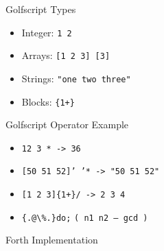 \documentclass{beamer}
\newcommand{\zwischenueberschrift}[1] { 
    \Huge{#1}
}
\begin{document}
\begin{frame}
    
    \vspace{0.5cm}

    Golfscript Types
    \begin{itemize}
        \item Integer: \texttt{1 2}
        \item Arrays:  \texttt{[1 2 3] [3]}
        \item Strings: \texttt{"one two three"}
        \item Blocks:  \texttt{\{1+\}}
    \end{itemize}

    \vspace{0.5cm}
    \pause 

    Golfscript Operator Example
    \begin{itemize}
        \item \texttt{12 3 * -> 36}
        \item \texttt{[50 51 52]' '* -> "50 51 52"}
        \item \texttt{[1 2 3]\{1+\}/ -> 2 3 4 }
        \item \texttt{\{.@\textbackslash\%.\}do;}  \texttt{( n1 n2 -- gcd )}
    \end{itemize}


\end{frame}


\begin{frame}
\begin{center}
\zwischenueberschrift{Forth Implementation}
\end{center}
\end{frame}
\end{document}
